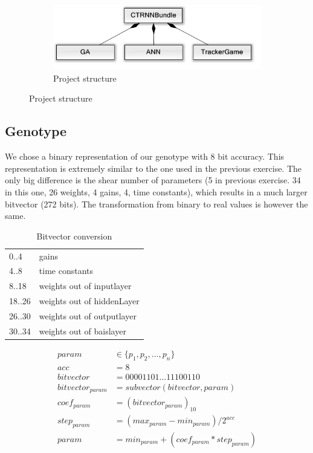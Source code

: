 \documentclass[12pt]{article}
\begin{document}
\begin{figure}
\begin{subfigure}{.3\textwidth}
			\label{fig:trackergamestruct}
		\end{subfigure}
		\begin{subfigure}{.3\textwidth}
			\centering
			\includegraphics[width=\linewidth]{./../images/Structure.png}
			\caption{Project structure}
			\label{fig:struct}
		\end{subfigure}
	\end{figure}

	\subsection{Genotype}
		We chose a binary representation of our genotype with 8 bit accuracy. This representation is extremely similar to the one used in the previous exercise. The only big difference is the shear number of parameters (5 in previous exercise. 34 in this one, 26 weights, 4 gains, 4, time constants), which results in a much larger bitvector (272 bits). The transformation from binary to real values is however the same. 
	\begin{table}[H]
		\parbox{.45\linewidth}{
			\centering
			\begin{tabular}{ll}
				0..4 & gains\\
        4..8 & time constants\\
        8..18 & weights out of inputlayer\\
				18..26 & weights out of hiddenLayer\\
        26..30 & weights out of outputlayer\\
				30..34 & weights out of baislayer
			\end{tabular}
			\caption{Structure of bitvector}
		}
		\hfill
		\parbox{.45\linewidth}{
			\centering
			\begin{align}
				param &\in \{p_1, p_2, \dots, p_n\}\nonumber\\
				acc &= 8\nonumber\\
				bitvector &= 00001101\dots11100110\nonumber\\
				bitvector_{param} &= subvector(bitvector, param)\nonumber\\
				coef_{param} &= (bitvector_{param})_{10}\nonumber\\
				step_{param} &= (max_{param}-min_{param})/2^{acc}\nonumber\\
				param &= min_{param}+(coef_{param}*step_{param})\nonumber
			\end{align}
			\caption{Bitvector conversion}
		}
	\end{table}
	
\end{document}
